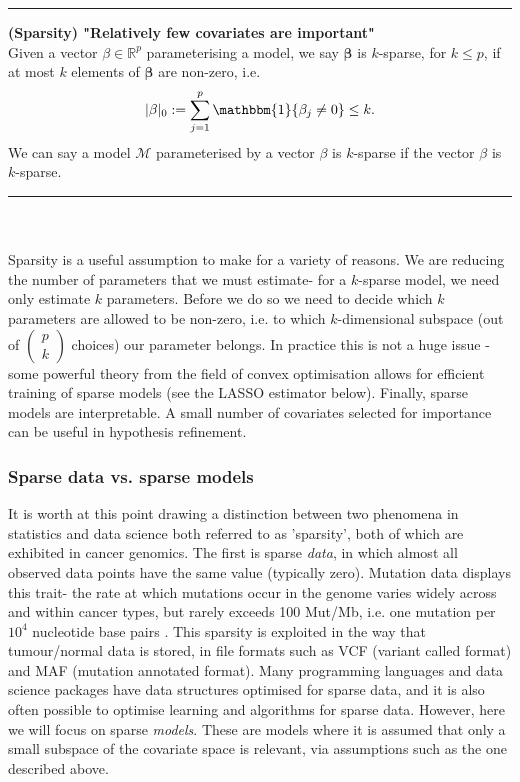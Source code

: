 \documentclass[thesis.tex]{subfiles}
\begin{document}
\hrule 
\begin{definition}{\textbf{(Sparsity) "Relatively few covariates are important"} \label{def:sparse}} \\
Given a vector $\beta \in \mathbb{R}^p$ parameterising a model, we say $\mathbf{\beta}$ is $k$-sparse, for $k \leq p$, if at most $k$ elements of $\mathbf{\beta}$ are non-zero, i.e.
$$|\mathbf{\beta}|_0 := \sum_{j=1}^{p}\mathbbm{1}\{\beta_j \neq 0\} \leq k. $$
We can say a model $\mathcal{M}$ parameterised by a vector $\beta$ is $k$-sparse if the vector $\beta$ is $k$-sparse.
\end{definition}
\hrule 
~\\~\\

Sparsity is a useful assumption to make for a variety of reasons. We are reducing the number of parameters that we must estimate- for a $k$-sparse model, we need only estimate $k$ parameters. Before we do so we need to decide which $k$ parameters are allowed to be non-zero, i.e. to which $k$-dimensional subspace (out of $\begin{pmatrix} p \\ k \end{pmatrix}$ choices) our parameter belongs. In practice this is not a huge issue - some powerful theory from the field of convex optimisation allows for efficient training of sparse models (see the LASSO estimator below). Finally, sparse models are interpretable. A small number of covariates selected for importance can be useful in hypothesis refinement.

\subsubsection{Sparse data vs. sparse models}
It is worth at this point drawing a distinction between two phenomena in statistics and data science both referred to as 'sparsity', both of which are exhibited in cancer genomics. The first is sparse \textit{data}, in which almost all observed data points have the same value (typically zero). Mutation data displays this trait- the rate at which mutations occur in the genome varies widely across and within cancer types, but rarely exceeds 100 Mut/Mb, i.e. one mutation per $10^4$ nucleotide base pairs \citep{chalmers_analysis_2017}. This sparsity is exploited in the way that tumour/normal  data is stored, in file formats such as VCF (variant called format) and MAF (mutation annotated format). Many programming languages and data science packages have data structures optimised for sparse data, and it is also often possible to optimise learning and algorithms for sparse data. However, here we will focus on sparse \textit{models}. These are models where it is assumed that only a small subspace of the covariate space is relevant, via assumptions such as the one described above. 
\end{document}
